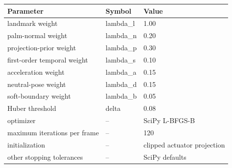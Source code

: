 \begin{tabular}{lll}
\toprule
Parameter & Symbol & Value \\
\midrule
landmark weight & lambda\_l & 1.00 \\
palm-normal weight & lambda\_n & 0.20 \\
projection-prior weight & lambda\_p & 0.30 \\
first-order temporal weight & lambda\_s & 0.10 \\
acceleration weight & lambda\_a & 0.15 \\
neutral-pose weight & lambda\_d & 0.15 \\
soft-boundary weight & lambda\_b & 0.05 \\
Huber threshold & delta & 0.08 \\
optimizer & -- & SciPy L-BFGS-B \\
maximum iterations per frame & -- & 120 \\
initialization & -- & clipped actuator projection \\
other stopping tolerances & -- & SciPy defaults \\
\bottomrule
\end{tabular}
